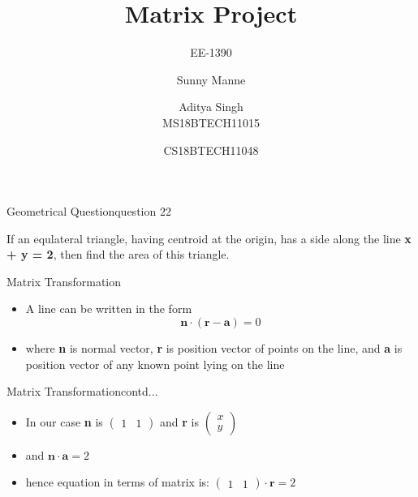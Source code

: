 \documentclass{beamer}
\title{\Huge Matrix Project}
\subtitle{\huge EE-1390}
\author{Sunny Manne \and Aditya Singh \\MS18BTECH11015 \and CS18BTECH11048}
\begin{document}
\begin{frame}
  \titlepage
\end{frame}
\begin{frame}{\LARGE Geometrical Question}{question 22}
	
	{\Large If an equlateral triangle, having centroid at the origin, has a        	side along the line \textbf{x + y = 2}, then find the area of this triangle.}
	

\end{frame}

\begin{frame}{\LARGE Matrix Transformation}
	\begin{itemize}
	
	\item {A line can be written in the form $$\textbf{n}\cdot(\textbf{r} - \textbf{a}) = 0$$}
	
	\item {where \textbf{n} is normal vector, \textbf{r} is position vector of points on the line, and \textbf{a} is position vector of any known point lying on the line }
	

	\end{itemize}

\end{frame}

\begin{frame}{\LARGE Matrix Transformation}{contd...}
	\begin{itemize}
	
	\item {In our case  \textbf{n} is $(\begin{array}{cc}1 & 1
	
	\end{array})
	$ and \textbf{r} is $(\begin{array}{c}x \\ y
	
	\end{array})
	$}
	
	\item {and  $\textbf{n}\cdot \textbf{a} = 2$}
	
	\item {hence equation in terms of matrix is: $(\begin{array}{cc}1 & 1
	
	\end{array})\cdot \textbf{r} = 2
	$ }
	

	\end{itemize}

\end{frame}
\end{document}
